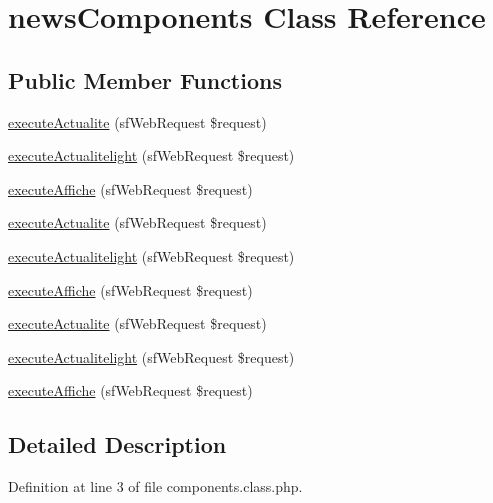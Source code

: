 \hypertarget{classnews_components}{\section{news\-Components Class Reference}
\label{classnews_components}
}
\subsection*{Public Member Functions}
\begin{DoxyCompactItemize}
\item 
\hyperlink{classnews_components_a7a58f4bedd74e0d338b5619d4bd4bdc0}{execute\-Actualite} (sf\-Web\-Request \$request)
\item 
\hyperlink{classnews_components_adcecc469c6ca9be1a2b028a82edde876}{execute\-Actualitelight} (sf\-Web\-Request \$request)
\item 
\hyperlink{classnews_components_a4a42c2c827f526e731b0350957955f0f}{execute\-Affiche} (sf\-Web\-Request \$request)
\item 
\hyperlink{classnews_components_a7a58f4bedd74e0d338b5619d4bd4bdc0}{execute\-Actualite} (sf\-Web\-Request \$request)
\item 
\hyperlink{classnews_components_adcecc469c6ca9be1a2b028a82edde876}{execute\-Actualitelight} (sf\-Web\-Request \$request)
\item 
\hyperlink{classnews_components_a4a42c2c827f526e731b0350957955f0f}{execute\-Affiche} (sf\-Web\-Request \$request)
\item 
\hyperlink{classnews_components_a7a58f4bedd74e0d338b5619d4bd4bdc0}{execute\-Actualite} (sf\-Web\-Request \$request)
\item 
\hyperlink{classnews_components_adcecc469c6ca9be1a2b028a82edde876}{execute\-Actualitelight} (sf\-Web\-Request \$request)
\item 
\hyperlink{classnews_components_a4a42c2c827f526e731b0350957955f0f}{execute\-Affiche} (sf\-Web\-Request \$request)
\end{DoxyCompactItemize}


\subsection{Detailed Description}


Definition at line 3 of file components.\-class.\-php.



